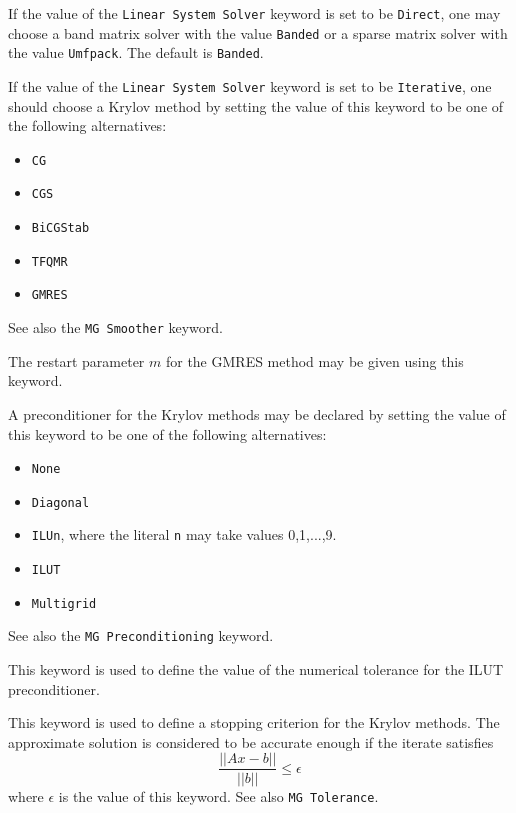 If the value of the {\tt Linear System Solver} keyword is set to be 
{\tt Direct}, one may choose a band matrix solver with 
the value \texttt{Banded} or a sparse matrix solver with 
the value \texttt{Umfpack}. The default is \texttt{Banded}.

If the value of the {\tt Linear System Solver} keyword is set to be 
{\tt Iterative}, one should choose a Krylov method by setting the value of this keyword to be 
one of the following alternatives:
\begin{itemize}
\item {\tt CG}
\item {\tt CGS}
\item {\tt BiCGStab}
\item {\tt TFQMR}
\item {\tt GMRES}
\end{itemize}
See also the {\tt MG Smoother} keyword.

The restart parameter $m$ for the GMRES method may be given using this keyword.

A preconditioner for the Krylov methods may be declared by setting the value of this keyword to be 
one of the following alternatives: 
\begin{itemize}
\item {\tt None}
\item {\tt Diagonal}
\item {\tt ILUn}, where the literal {\tt n} may take values 0,1,...,9.
\item {\tt ILUT}
\item {\tt Multigrid}
\end{itemize}
See also the {\tt MG Preconditioning} keyword.


This keyword is used to define the value of 
the numerical tolerance for the ILUT preconditioner.

This keyword is used to define a stopping criterion for the Krylov methods. 
The approximate solution is considered to be accurate enough if the iterate satisfies
\begin{equation*}
\frac{|| Ax - b ||}{||b||} \le \epsilon
\end{equation*}
where $\epsilon$ is the value of this keyword.
See also {\tt MG Tolerance}.

